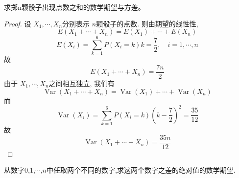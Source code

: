 \documentclass[../main.tex]{subfiles}
\begin{document}
\begin{exercise}{}{}
求掷n颗骰子出现点数之和的数学期望与方差。
\end{exercise}

\begin{proof}
  设 \(  X_1,\cdots ,X_{n}  \)分别表示 \(  n  \)颗骰子的点数. 则由期望的线性性,  \[
  E\left( X_1+ \cdots + X_{n} \right)= E\left( X_1 \right)+ \cdots + E\left( X_{n} \right)   
  \]   \[
  E\left( X_{i} \right)= \sum _{ k= 1}^{6}P\left( X_{i}= k \right)k=\frac{7 }{2 }    ,\quad i= 1,\cdots ,n
  \]故 \[
  E\left( X_1+ \cdots + X_{n} \right) = \frac{7n }{2 } 
  \]由于 \(  X_1,\cdots ,X_{n}  \)之间相互独立, 我们有 \[
  \operatorname{Var}\left( X_1+ \cdots + X_{n} \right)= \operatorname{Var}\left( X_1 \right)+ \cdots + \operatorname{Var}\left( X_{n} \right)   
  \] 而 \[
  \operatorname{Var}\left( X_{i} \right)= \sum _{k= 1}^{6}P\left( X_{i}= k \right)\left( k-\frac{7 }{2 }  \right)^{2}= \frac{35 }{12 }   
  \]故 \[
  \operatorname{Var}\left( X_1+ \cdots + X_{n} \right)= \frac{35n }{12 }  
  \]
\end{proof}
\begin{exercise}{}{}
从数字0,1,\(\cdots\),\(n\)中任取两个不同的数字,求这两个数字之差的绝对值的数学期望.
\end{exercise}
\end{document}
